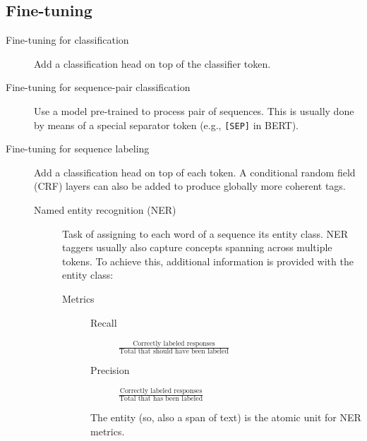 \subsection{Fine-tuning}

\begin{description}
    \item[Fine-tuning for classification]
        Add a classification head on top of the classifier token.

    \item[Fine-tuning for sequence-pair classification]
        Use a model pre-trained to process pair of sequences. This is usually done by means of a special separator token (e.g., \texttt{[SEP]} in BERT).

    \item[Fine-tuning for sequence labeling]
        Add a classification head on top of each token. A conditional random field (CRF) layers can also be added to produce globally more coherent tags.

        \begin{description}
            \item[Named entity recognition (NER)] 
            Task of assigning to each word of a sequence its entity class. NER taggers usually also capture concepts spanning across multiple tokens. To achieve this, additional information is provided with the entity class:

            \begin{description}
                \item[Metrics] \phantom{}
                    \begin{description}
                        \item[Recall] $\frac{\text{Correctly labeled responses}}{\text{Total that should have been labeled}}$
                        \item[Precision] $\frac{\text{Correctly labeled responses}}{\text{Total that has been labeled}}$
                    \end{description}

                    \begin{remark}
                        The entity (so, also a span of text) is the atomic unit for NER metrics.
                    \end{remark}
            \end{description}
        \end{description}
\end{description}


